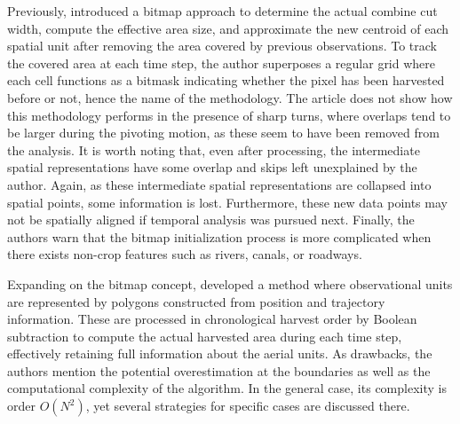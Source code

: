 Previously, \cite{Han1997} introduced a bitmap approach to determine
the actual combine cut width, compute the effective area size, and
approximate the new centroid of each spatial unit after removing the
area covered by previous observations. To track the covered area at
each time step, the author superposes a regular grid where each cell
functions as a bitmask indicating whether the pixel has been harvested
before or not, hence the name of the methodology. The article does not
show how this methodology performs in the presence of sharp turns,
where overlaps tend to be larger during the pivoting motion, as these
seem to have been removed from the analysis. It is worth noting that,
even after processing, the intermediate spatial representations have
some overlap and skips left unexplained by the author. Again, as
these intermediate spatial representations are collapsed into spatial
points, some information is lost. Furthermore, these new data points
may not be spatially aligned if temporal analysis was pursued
next. Finally, the authors warn that the bitmap initialization process
is more complicated when there exists non-crop features such as
rivers, canals, or roadways.

Expanding on the bitmap concept, \cite{Drummond1999} developed a
method where observational units are represented by polygons
constructed from position and trajectory information. These are
processed in chronological harvest order by Boolean subtraction to
compute the actual harvested area during each time step, effectively
retaining full information about the aerial units. As drawbacks, the
authors mention the potential overestimation at the boundaries as well
as the computational complexity of the algorithm. In the general case,
its complexity is order $O(N^2)$, yet several strategies for specific
cases are discussed there.


